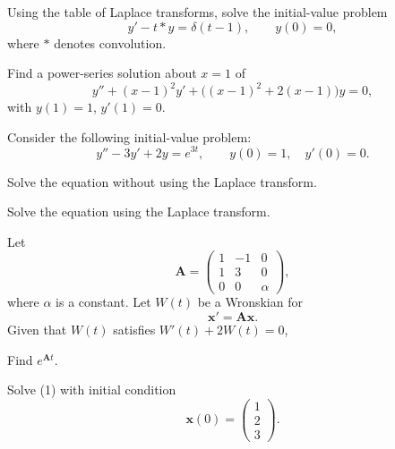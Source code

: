 \documentclass[11pt,oneside]{article}
\begin{document}
\begin{problem}
Using the table of Laplace transforms, solve the initial-value problem
\[
y'-t\ast y=\delta(t-1),\qquad y(0)=0,
\]
where $\ast$ denotes convolution.
\end{problem}

\begin{problem}
Find a power-series solution about $x=1$ of
\[
y''+(x-1)^2y'+\bigl((x-1)^2+2(x-1)\bigr)y=0,
\]
with $y(1)=1$, $y'(1)=0$.
\end{problem}

\begin{problem}
Consider the following initial-value problem:
\[
y''-3y'+2y=e^{3t},\qquad y(0)=1,\quad y'(0)=0.
\]
\begin{problemsubparts}
\item Solve the equation without using the Laplace transform.
\item Solve the equation using the Laplace transform.
\end{problemsubparts}
\end{problem}

\begin{problem}
Let
\[
\mathbf A=\begin{pmatrix}1&-1&0\\1&3&0\\0&0&\alpha\end{pmatrix},
\]
where $\alpha$ is a constant. Let $W(t)$ be a Wronskian for
\[
\mathbf x'=\mathbf A\mathbf x.\tag{1}
\]
Given that $W(t)$ satisfies $W'(t)+2W(t)=0$,
\begin{problemsubparts}
\item Find $e^{\mathbf A t}$.
\item Solve (1) with initial condition
\[
\mathbf x(0)=\begin{pmatrix}1\\2\\3\end{pmatrix}.
\]
\end{problemsubparts}
\end{problem}
\end{document}
